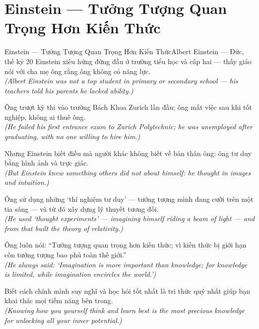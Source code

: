 \section{Einstein --- Tưởng Tượng Quan Trọng Hơn Kiến Thức}
\begin{truyen}{Einstein --- Tưởng Tượng Quan Trọng Hơn Kiến Thức}{Albert Einstein --- Đức, thế kỷ 20}
 Einstein xiêu hứng đứng đầu ở trường tiểu học và cấp hai --- thầy giáo nói với cha mẹ ông rằng ông không có năng lực.\\[4pt]
\textit{(Albert Einstein was not a top student in primary or secondary school --- his teachers told his parents he lacked ability.)}

Ông trượt kỳ thi vào trường Bách Khoa Zurich lần đầu; ông mất việc sau khi tốt nghiệp, không ai thuê ông.\\[4pt]
\textit{(He failed his first entrance exam to Zurich Polytechnic; he was unemployed after graduating, with no one willing to hire him.)}

Nhưng Einstein biết điều mà người khác không biết về bản thân ông: ông tư duy bằng hình ảnh và trực giác.\\[4pt]
\textit{(But Einstein knew something others did not about himself: he thought in images and intuition.)}

Ông sử dụng những `thí nghiệm tư duy' --- tưởng tượng mình đang cưỡi trên một tia sáng --- và từ đó xây dựng lý thuyết tương đối.\\[4pt]
\textit{(He used `thought experiments' --- imagining himself riding a beam of light --- and from that built the theory of relativity.)}

Ông luôn nói: ``Tưởng tượng quan trọng hơn kiến thức; vì kiến thức bị giới hạn còn tưởng tượng bao phủ toàn thế giới.''\\[4pt]
\textit{(He always said: `Imagination is more important than knowledge; for knowledge is limited, while imagination encircles the world.')}

\end{truyen}
\begin{baihoc}
  Biết cách chính mình suy nghĩ và học hỏi tốt nhất là tri thức quý nhất giúp bạn khai thác mọi tiềm năng bên trong.\\[4pt]
  \textit{(Knowing how you yourself think and learn best is the most precious knowledge for unlocking all your inner potential.)}
\end{baihoc}

